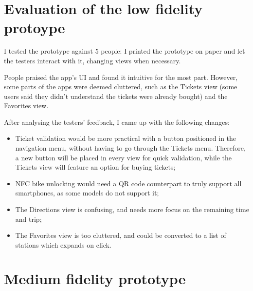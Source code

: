 \documentclass[11pt]{article}
\begin{document}
\section{Evaluation of the low fidelity protoype}

I tested the prototype against 5 people: I printed the prototype on paper and let the testers interact with it, changing views when necessary.

People praised the app's UI and found it intuitive for the most part. However, some parts of the apps were deemed cluttered, such as the Tickets view (some users said they didn't understand the tickets were already bought) and the Favorites view.

After analysing the testers' feedback, I came up with the following changes:

\begin{itemize}
    \item Ticket validation would be more practical with a button positioned in the navigation menu, without having to go through the Tickets menu. Therefore, a new button will be placed in every view for quick validation, while the Tickets view will feature an option for buying tickets;
    \item NFC bike unlocking would need a QR code counterpart to truly support all smartphones, as some models do not support it;
    \item The Directions view is confusing, and needs more focus on the remaining time and trip;
    \item The Favorites view is too cluttered, and could be converted to a list of stations which expands on click.
\end{itemize}

\section{Medium fidelity prototype}
\end{document}
